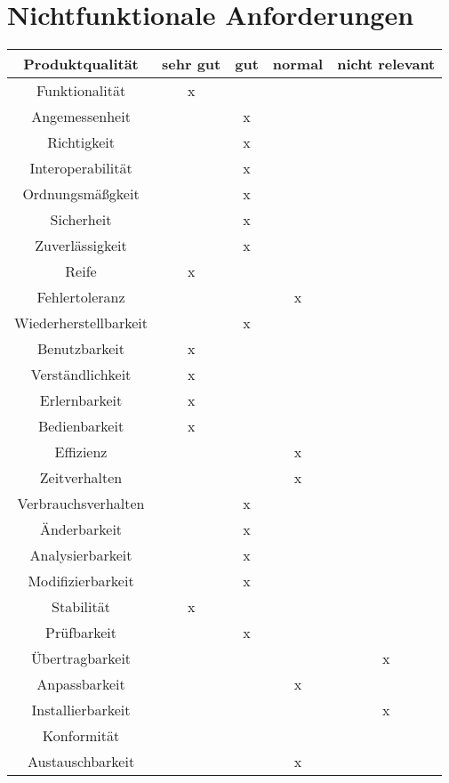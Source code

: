 
\chapter{Nichtfunktionale Anforderungen}


\begin{tabular}{|c|c|c|c|c|}
  \hline                                              %

  \textbf{Produktqualität}  & \textbf{sehr gut}  &    \textbf{gut}  &
  \textbf{normal}           & \textbf{nicht relevant}  \\  %
  \hline                                              %

Funktionalität  &x&&&\\        %
  \hline
Angemessenheit&&x&&\\
\hline
Richtigkeit&&x&&\\
\hline
Interoperabilität&&x&&\\
\hline
Ordnungsmäßgkeit&&x&&\\
\hline
Sicherheit&&x&&\\
\hline
Zuverlässigkeit&&x&&\\
\hline
Reife&x&&&\\
\hline
Fehlertoleranz&&&x&\\
\hline
Wiederherstellbarkeit&&x&&\\
\hline
Benutzbarkeit&x&&&\\
\hline
Verständlichkeit&x&&&\\
\hline
Erlernbarkeit&x&&&\\
\hline
Bedienbarkeit&x&&&\\
\hline
Effizienz&&&x&\\
\hline
Zeitverhalten&&&x&\\
\hline
Verbrauchsverhalten&&x&&\\
\hline
Änderbarkeit&&x&&\\
\hline
Analysierbarkeit&&x&&\\
\hline
Modifizierbarkeit&&x&&\\
\hline
Stabilität&x&&&\\
\hline
Prüfbarkeit&&x&&\\
\hline
Übertragbarkeit&&&&x\\
\hline
Anpassbarkeit&&&x&\\
\hline
Installierbarkeit&&&&x\\
\hline
Konformität&&&&\\
\hline
Austauschbarkeit&&&x&\\
\hline
\end{tabular}


